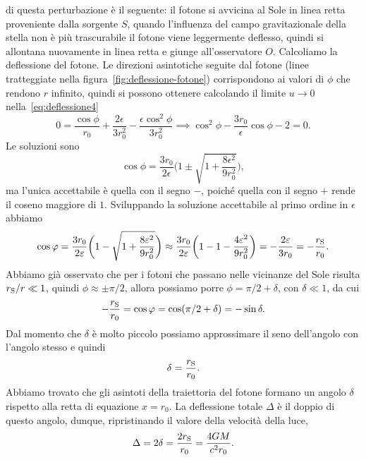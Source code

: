 di questa perturbazione è il seguente: il fotone si avvicina al Sole in linea
retta proveniente dalla sorgente $S$, quando l'influenza del campo
gravitazionale della stella non è più trascurabile il fotone viene leggermente
deflesso, quindi si allontana nuovamente in linea retta e giunge all'osservatore
$O$.  Calcoliamo la deflessione del fotone.  Le direzioni asintotiche seguite
dal fotone (linee tratteggiate nella figura~\ref{fig:deflessione-fotone})
corrispondono ai valori di $\phi$ che rendono $r$ infinito, quindi si possono
ottenere calcolando il limite $u \to 0$ nella~\eqref{eq:deflessione4}
\begin{equation}
  0 = \frac{\cos\phi}{r_{0}} + \frac{2\epsilon}{3r_{0}^{2}} -
  \frac{\epsilon\cos^{2}\phi}{3r_{0}^{2}} \implies \cos^{2}\phi -
  \frac{3r_{0}}{\epsilon}\cos\phi - 2 = 0.
\end{equation}
Le soluzioni sono
\begin{equation}
  \cos\phi = \frac{3r_{0}}{2\epsilon}\bigg(1 \pm \sqrt{1 +
    \frac{8\epsilon^{2}}{9r_{0}^{2}}}\bigg),
\end{equation}
ma l'unica accettabile è quella con il segno $-$, poiché quella con il segno $+$
rende il coseno maggiore di $1$.  Sviluppando la soluzione accettabile al primo
ordine in $\epsilon$ abbiamo
\begin{equation}
  \cos\phi = \frac{3r_{0}}{2\epsilon}\bigg(1 - \sqrt{1 +
    \frac{8\epsilon^{2}}{9r_{0}^{2}}}\bigg) \approx
  \frac{3r_{0}}{2\epsilon}\bigg(1 - 1 - \frac{4\epsilon^{2}}{9r_{0}^{2}}\bigg) =
  -\frac{2\epsilon}{3r_{0}} = -\frac{r_{\textup{S}}}{r_{0}}.
\end{equation}
Abbiamo già osservato che per i fotoni che passano nelle vicinanze del Sole
risulta $r_{\textup{S}}/r \ll 1$, quindi $\phi \approx \pm \pi/2$, allora
possiamo porre $\phi = \pi/2 + \delta$, con $\delta \ll 1$, da cui
\begin{equation}
  -\frac{r_{\textup{S}}}{r_{0}} = \cos\phi = \cos(\pi/2 + \delta) = -\sin\delta.
\end{equation}
Dal momento che $\delta$ è molto piccolo possiamo approssimare il seno
dell'angolo con l'angolo stesso e quindi
\begin{equation}
  \delta = \frac{r_{\textup{S}}}{r_{0}}.
\end{equation}
Abbiamo trovato che gli asintoti della traiettoria del fotone formano un angolo
$\delta$ rispetto alla retta di equazione $x = r_{0}$.  La deflessione totale
$\Delta$ è il doppio di questo angolo, dunque, ripristinando il valore della
velocità della luce,
\begin{equation}
  \Delta = 2\delta = \frac{2r_{\textup{S}}}{r_{0}} = \frac{4GM}{c^{2}r_{0}}.
\end{equation}


